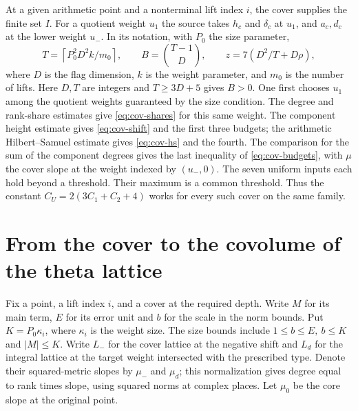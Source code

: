At a given arithmetic point and a nonterminal lift index \(i\), the cover
supplies the finite set \(I\). For a quotient weight \(u_1\) the source
takes \(h_c\) and \(\delta_c\) at \(u_1\), and \(a_c,d_c\) at the
lower weight \(u_-\). In its notation, with \(P_0\) the size parameter,
\[
 T=\left\lceil P_0^2D^2 k/m_0\right\rceil,\qquad
 B=\binom{T-1}{D},\qquad z=7(D^2/T+D\rho),
\]
where \(D\) is the flag dimension, \(k\) is the weight parameter,
and \(m_0\) is the number of lifts. Here \(D,T\) are integers and
\(T\ge3D+5\) gives \(B>0\). One first chooses \(u_1\) among the
quotient weights guaranteed by the size condition. The degree and
rank-share estimates give \eqref{eq:cov-shares} for this same weight.
The component height estimate gives \eqref{eq:cov-shift} and the first
three budgets; the arithmetic Hilbert--Samuel estimate gives
\eqref{eq:cov-hs} and the fourth. The comparison for the sum of the
component degrees gives the last inequality of \eqref{eq:cov-budgets},
with \(\mu\) the cover slope at the weight indexed by \((u_-,0)\).
The seven uniform inputs each hold beyond a threshold. Their maximum
is a common threshold. Thus the constant \(C_U=2(3C_1+C_2+4)\)
works for every such cover on the same family.

\section{From the cover to the covolume of the theta lattice}
\label{sec:cov-lattice}

Fix a point, a lift index \(i\), and a cover at the required depth.
Write \(M\) for its main term, \(E\) for its error unit and \(b\) for
the scale in the norm bounds. Put \(K=P_0\kappa_i\), where \(\kappa_i\)
is the weight size. The size bounds include \(1\le b\le E,\ b\le K\)
and \(|M|\le K\). Write \(L_-\) for the cover lattice at the negative
shift and \(L_d\) for the integral lattice at the target weight
intersected with the prescribed type. Denote their squared-metric
slopes by \(\mu_-\) and \(\mu_d\); this normalization gives degree
equal to rank times slope, using squared norms at complex places.
Let \(\mu_0\) be the core slope at the original point.

